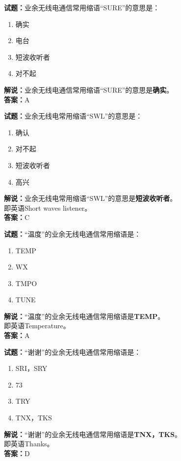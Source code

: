 \documentclass{ctexbook}
\begin{document}
\bigskip


\noindent\textbf{试题：}业余无线电通信常用缩语“SURE”的意思是：
\begin{enumerate}[leftmargin=3em]
\item 确实
\item 电台
\item 短波收听者
\item 对不起
\end{enumerate}
\noindent\textbf{解说：}业余无线电通信常用缩语“SURE”的意思是\textbf{确实}。\\\noindent\textbf{答案：}A


\bigskip


\noindent\textbf{试题：}业余无线电常用缩语“SWL”的意思是：
\begin{enumerate}[leftmargin=3em]
\item 确认
\item 对不起
\item 短波收听者
\item 高兴
\end{enumerate}
\noindent\textbf{解说：}业余无线电常用缩语“SWL”的意思是\textbf{短波收听者}。\\即英语Short waves listener。\\\noindent\textbf{答案：}C



\bigskip


\noindent\textbf{试题：}“温度”的业余无线电通信常用缩语是：
\begin{enumerate}[leftmargin=3em]
\item TEMP
\item WX
\item TMPO
\item TUNE
\end{enumerate}
\noindent\textbf{解说：}“温度”的业余无线电通信常用缩语是\textbf{TEMP}。\\即英语Temperature。\\\noindent\textbf{答案：}A


\bigskip


\noindent\textbf{试题：}“谢谢”的业余无线电通信常用缩语是：
\begin{enumerate}[leftmargin=3em]
\item SRI，SRY
\item 73
\item TRY
\item TNX，TKS
\end{enumerate}
\noindent\textbf{解说：}“谢谢”的业余无线电通信常用缩语是\textbf{TNX，TKS}。\\即英语Thanks。\\\noindent\textbf{答案：}D
\end{document}
